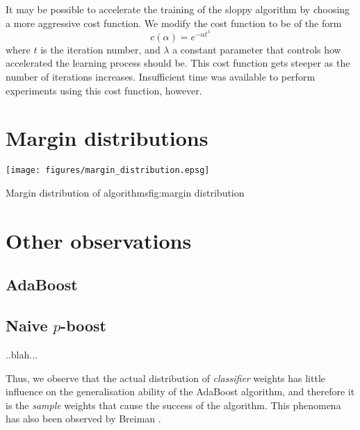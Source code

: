 It may be possible to accelerate the training of the sloppy algorithm
by choosing a more aggressive cost function.  We modify the cost
function to be of the form
%
\begin{equation}
c(\alpha) = e^{-\alpha t^\lambda}
\end{equation}
%
where $t$ is the iteration number, and $\lambda$ a constant parameter
that controls how accelerated the learning process should be.  This
cost function gets steeper as the number of iterations increases.
Insufficient time was available to perform experiments using this cost
function, however.


\section{Margin distributions}


\begin{linefigure}
\begin{center}
\texttt{[image: figures/margin\_distribution.epsg]}
\end{center}
\begin{capt}{Margin distribution of algorithms}{fig:margin distribution}
\end{capt}
\end{linefigure}


\section{Other observations}

\subsection{AdaBoost}

\subsection{Naive $p$-boost}

..blah...

Thus, we observe that the actual distribution of \emph{classifier}
weights has little influence on the generalisation ability of the
AdaBoost algorithm, and therefore it is the \emph{sample} weights that
cause the success of the algorithm.  This phenomena has also been
observed by Breiman \cite{Breiman96}.


